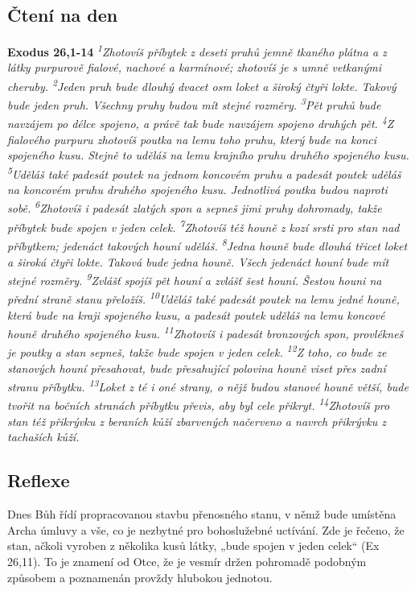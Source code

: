 \documentclass[11pt]{article}
\begin{document}
\subsection*{Čtení na den}
\textbf{Exodus 26,1-14}
\newline
\textit{
\textsuperscript{1}Zhotovíš příbytek z deseti pruhů jemně tkaného plátna a z látky purpurově fialové, nachové a karmínové; zhotovíš je s umně vetkanými cheruby.
\textsuperscript{2}Jeden pruh bude dlouhý dvacet osm loket a široký čtyři lokte. Takový bude jeden pruh. Všechny pruhy budou mít stejné rozměry.
\textsuperscript{3}Pět pruhů bude navzájem po délce spojeno, a právě tak bude navzájem spojeno druhých pět.
\textsuperscript{4}Z fialového purpuru zhotovíš poutka na lemu toho pruhu, který bude na konci spojeného kusu. Stejně to uděláš na lemu krajního pruhu druhého spojeného kusu.
\textsuperscript{5}Uděláš také padesát poutek na jednom koncovém pruhu a padesát poutek uděláš na koncovém pruhu druhého spojeného kusu. Jednotlivá poutka budou naproti sobě.
\textsuperscript{6}Zhotovíš i padesát zlatých spon a sepneš jimi pruhy dohromady, takže příbytek bude spojen v jeden celek.
\textsuperscript{7}Zhotovíš též houně z kozí srsti pro stan nad příbytkem; jedenáct takových houní uděláš.
\textsuperscript{8}Jedna houně bude dlouhá třicet loket a široká čtyři lokte. Taková bude jedna houně. Všech jedenáct houní bude mít stejné rozměry.
\textsuperscript{9}Zvlášť spojíš pět houní a zvlášť šest houní. Šestou houni na přední straně stanu přeložíš.
\textsuperscript{10}Uděláš také padesát poutek na lemu jedné houně, která bude na kraji spojeného kusu, a padesát poutek uděláš na lemu koncové houně druhého spojeného kusu.
\textsuperscript{11}Zhotovíš i padesát bronzových spon, provlékneš je poutky a stan sepneš, takže bude spojen v jeden celek.
\textsuperscript{12}Z toho, co bude ze stanových houní přesahovat, bude přesahující polovina houně viset přes zadní stranu příbytku.
\textsuperscript{13}Loket z té i oné strany, o nějž budou stanové houně větší, bude tvořit na bočních stranách příbytku převis, aby byl cele přikryt.
\textsuperscript{14}Zhotovíš pro stan též přikrývku z beraních kůží zbarvených načerveno a navrch přikrývku z tachaších kůží.
}

\subsection*{Reflexe}
Dnes Bůh řídí propracovanou stavbu přenosného stanu, v němž bude umístěna Archa úmluvy a vše, co je
nezbytné pro bohoslužebné uctívání. Zde je řečeno, že stan, ačkoli vyroben z několika kusů látky, „bude
spojen v jeden celek“ (Ex 26,11). To je znamení od Otce, že je vesmír držen pohromadě podobným
způsobem a poznamenán provždy hlubokou jednotou.
\end{document}
